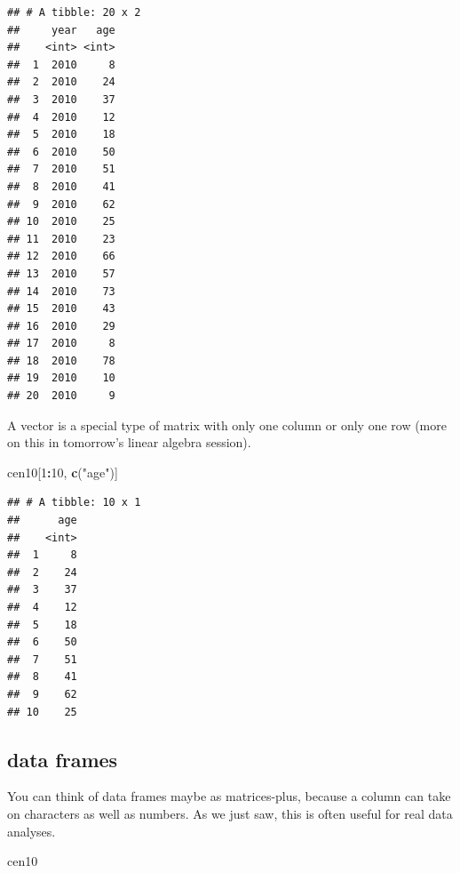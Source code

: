 \documentclass[]{book}
\newenvironment{Shaded}{\begin{snugshade}}{\end{snugshade}}
\newcommand{\KeywordTok}[1]{\textcolor[rgb]{0.13,0.29,0.53}{\textbf{#1}}}
\newcommand{\DecValTok}[1]{\textcolor[rgb]{0.00,0.00,0.81}{#1}}
\newcommand{\StringTok}[1]{\textcolor[rgb]{0.31,0.60,0.02}{#1}}
\newcommand{\OperatorTok}[1]{\textcolor[rgb]{0.81,0.36,0.00}{\textbf{#1}}}
\newcommand{\NormalTok}[1]{#1}
\theoremstyle{definition}
\theoremstyle{definition}
\theoremstyle{definition}
\theoremstyle{remark}
\begin{document}
\begin{verbatim}
## # A tibble: 20 x 2
##     year   age
##    <int> <int>
##  1  2010     8
##  2  2010    24
##  3  2010    37
##  4  2010    12
##  5  2010    18
##  6  2010    50
##  7  2010    51
##  8  2010    41
##  9  2010    62
## 10  2010    25
## 11  2010    23
## 12  2010    66
## 13  2010    57
## 14  2010    73
## 15  2010    43
## 16  2010    29
## 17  2010     8
## 18  2010    78
## 19  2010    10
## 20  2010     9
\end{verbatim}

A vector is a special type of matrix with only one column or only one
row (more on this in tomorrow's linear algebra session).

\begin{Shaded}
\begin{Highlighting}[]
\NormalTok{cen10[}\DecValTok{1}\OperatorTok{:}\DecValTok{10}\NormalTok{, }\KeywordTok{c}\NormalTok{(}\StringTok{"age"}\NormalTok{)]}
\end{Highlighting}
\end{Shaded}

\begin{verbatim}
## # A tibble: 10 x 1
##      age
##    <int>
##  1     8
##  2    24
##  3    37
##  4    12
##  5    18
##  6    50
##  7    51
##  8    41
##  9    62
## 10    25
\end{verbatim}

\subsection{data frames}\label{data-frames}

You can think of data frames maybe as matrices-plus, because a column
can take on characters as well as numbers. As we just saw, this is often
useful for real data analyses.

\begin{Shaded}
\begin{Highlighting}[]
\NormalTok{cen10}
\end{Highlighting}
\end{Shaded}
\end{document}
